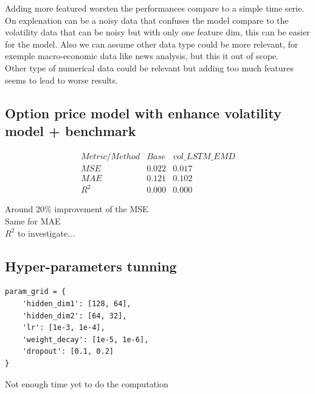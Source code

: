 \documentclass[letterpaper,11pt]{article}
\begin{document}
Adding more featured worsten the performances compare to a simple time serie. On explenation can be a noisy data that confuses the model compare to the volatility data that can be noisy but with only one feature dim, this can be easier for the model. Also we can assume other data type could be more relevant, for exemple macro-economic data like news analysis, but this it out of scope.\\

Other type of numerical data could be relevant but adding too much features seems to lead to worse results.


\bigskip

\subsection*{Option price model with enhance volatility model + benchmark}


\bigskip
\[
\begin{array}{ccc}
Metric/Method & Base & vol\_LSTM\_EMD \\
\hline
MSE & 0.022 & 0.017\\
MAE & 0.121 & 0.102 \\
R^{2} & 0.000 & 0.000 
\end{array}
\]
\bigskip

Around $20\%$ improvement of the MSE\\
Same for MAE\\
$R^2$ to investigate...
\bigskip
\subsection*{Hyper-parameters tunning}


\begin{verbatim}
param_grid = {
    'hidden_dim1': [128, 64],
    'hidden_dim2': [64, 32],
    'lr': [1e-3, 1e-4],
    'weight_decay': [1e-5, 1e-6],
    'dropout': [0.1, 0.2]
}
\end{verbatim}

Not enough time yet to do the computation 
\end{document}
